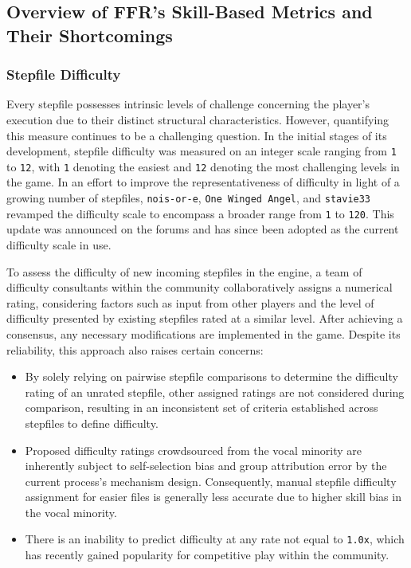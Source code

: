 \subsection{Overview of FFR's Skill-Based Metrics and Their Shortcomings}
\subsubsection{Stepfile Difficulty}
Every stepfile possesses intrinsic levels of challenge concerning the player's execution due to their distinct structural characteristics. However, quantifying this measure continues to be a challenging question. In the initial stages of its development, stepfile difficulty was measured on an integer scale ranging from \texttt{1} to \texttt{12}, with \texttt{1} denoting the easiest and \texttt{12} denoting the most challenging levels in the game. In an effort to improve the representativeness of difficulty in light of a growing number of stepfiles, \texttt{nois-or-e}, \texttt{One Winged Angel}, and \texttt{stavie33} revamped the difficulty scale to encompass a broader range from \texttt{1} to \texttt{120}. This update was announced on the forums \cite{20120608} and has since been adopted as the current difficulty scale in use.

\vspace{2mm}

To assess the difficulty of new incoming stepfiles in the engine, a team of difficulty consultants within the community collaboratively assigns a numerical rating, considering factors such as input from other players and the level of difficulty presented by existing stepfiles rated at a similar level. After achieving a consensus, any necessary modifications are implemented in the game. Despite its reliability, this approach also raises certain concerns:

\begin{itemize}
	\item By solely relying on pairwise stepfile comparisons to determine the difficulty rating of an unrated stepfile, other assigned ratings are not considered during comparison, resulting in an inconsistent set of criteria established across stepfiles to define difficulty.
	\item Proposed difficulty ratings crowdsourced from the vocal minority are inherently subject to self-selection bias and group attribution error by the current process's mechanism design. Consequently, manual stepfile difficulty assignment for easier files is generally less accurate due to higher skill bias in the vocal minority.
	\item There is an inability to 
	      predict difficulty at any rate not equal to \texttt{1.0x}, which has recently gained popularity for competitive play within the community.
\end{itemize}

